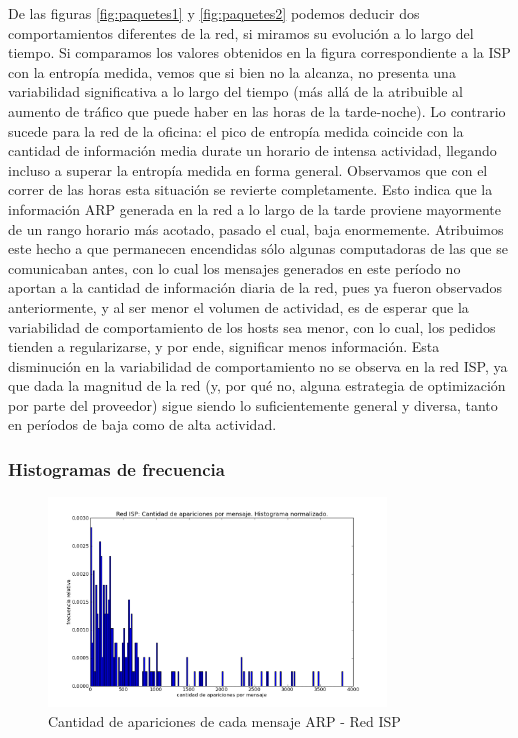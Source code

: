 De las figuras \ref{fig:paquetes1} y \ref{fig:paquetes2} podemos deducir dos comportamientos diferentes de la red, si miramos su evolución a lo largo del tiempo. Si comparamos los valores obtenidos en la figura correspondiente a la ISP con la entropía medida, vemos que si bien no la alcanza, no presenta una variabilidad significativa a lo largo del tiempo (más allá de la atribuible al aumento de tráfico que puede haber en las horas de la tarde-noche). Lo contrario sucede para la red de la oficina: el pico de entropía medida coincide con la cantidad de información media durate un horario de intensa actividad, llegando incluso a superar la entropía medida en forma general. Observamos que con el correr de las horas esta situación se revierte completamente. Esto indica que la información ARP generada en la red a lo largo de la tarde proviene mayormente de un rango horario más acotado, pasado el cual, baja enormemente. Atribuimos este hecho a que permanecen encendidas sólo algunas computadoras de las que se comunicaban antes, con lo cual los mensajes generados en este período no aportan a la cantidad de información diaria de la red, pues ya fueron observados anteriormente, y al ser menor el volumen de actividad, es de esperar que la variabilidad de comportamiento de los hosts sea menor, con lo cual, los pedidos tienden a regularizarse, y por ende, significar menos información. Esta disminución en la variabilidad de comportamiento no se observa en la red ISP, ya que dada la magnitud de la red (y, por qué no, alguna estrategia de optimización por parte del proveedor) sigue siendo lo suficientemente general y diversa, tanto en períodos de baja como de alta actividad.

\subsubsection{Histogramas de frecuencia}

\begin{figure}[H]
	\centering
	\includegraphics[width=0.8\textwidth]{graficos/hist_casa.png}
	\caption{Cantidad de apariciones de cada mensaje ARP - Red ISP}
	\label{fig:hist5}
\end{figure}


